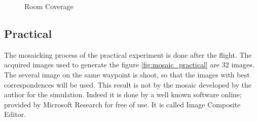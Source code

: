 \begin{figure}[H]
  \centering
  \hfill
  \caption{Room Coverage}
  
  \label{fig:final_room}
  
\end{figure}




\subsection{Practical}
The mosaicking process of the practical experiment is done after the flight. The acquired images used to generate the figure \ref{fig:mosaic_practical} are 32 images. The several image on the same waypoint is shoot, so that the images with best correspondences will be used. This result is not by the mosaic developed by the author for the simulation. Indeed it is done by a well known software online; provided by Microsoft Research for free of use. It is called Image Composite Editor.

